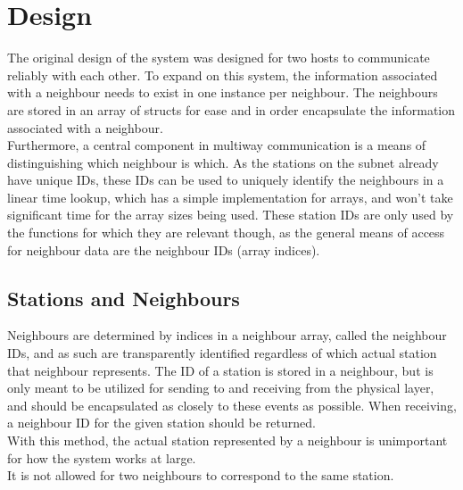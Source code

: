 \section{Design}


The original design of the system was designed for two hosts to communicate reliably with each other. To expand on this system, the information associated with a neighbour needs to exist in one instance per neighbour. The neighbours are stored in an array of structs for ease and in order encapsulate the information associated with a neighbour.\\
Furthermore, a central component in multiway communication is a means of distinguishing which neighbour is which. As the stations on the subnet already have unique IDs, these IDs can be used to uniquely identify the neighbours in a linear time lookup, which has a simple implementation for arrays, and won't take significant time for the array sizes being used. These station IDs are only used by the functions for which they are relevant though, as the general means of access for neighbour data are the neighbour IDs (array indices).

\subsection{Stations and Neighbours}
Neighbours are determined by indices in a neighbour array, called the neighbour IDs, and as such are transparently identified regardless of which actual station that neighbour represents. The ID of a station is stored in a neighbour, but is only meant to be utilized for sending to and receiving from the physical layer, and should be encapsulated as closely to these events as possible. When receiving, a neighbour ID for the given station should be returned.\\
With this method, the actual station represented by a neighbour is unimportant for how the system works at large.\\
It is not allowed for two neighbours to correspond to the same station.

% 

